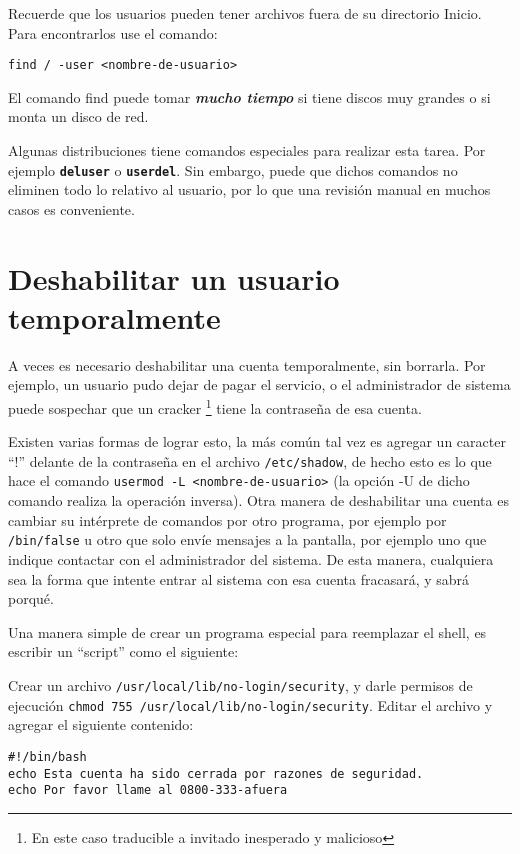\documentclass[12pt]{article}
\begin{document}
Recuerde que los usuarios pueden tener archivos fuera de su directorio
Inicio.  Para encontrarlos use el comando:

 \texttt{find / -user <nombre-de-usuario>} 

El comando find puede tomar \textit{\bf mucho tiempo} si
tiene discos muy grandes o si monta un disco de red.

Algunas distribuciones tiene comandos especiales para realizar esta tarea. Por 
ejemplo \texttt{\textbf{deluser}} o \texttt{\textbf{userdel}}. Sin embargo, puede 
que dichos comandos no eliminen todo lo relativo al usuario, por lo que una 
revisión manual en muchos casos es conveniente.  



\section*{ Deshabilitar un usuario temporalmente}

A veces es necesario deshabilitar una cuenta temporalmente, sin borrarla.
Por ejemplo, un usuario pudo dejar de pagar el servicio, o el administrador de
sistema puede sospechar que un cracker	\footnote{En este caso traducible a 
invitado inesperado y malicioso} tiene la contraseña de esa cuenta.

Existen varias formas de lograr esto, la más común tal vez es agregar un caracter 
``!'' delante de la contraseña en el archivo \texttt{/etc/shadow}, de hecho esto 
es lo que hace el comando \texttt{usermod -L <nombre-de-usuario>} (la opción -U
de dicho comando realiza la operación inversa). Otra manera de deshabilitar una 
cuenta es cambiar su intérprete de comandos por otro programa, por ejemplo por 
\texttt{/bin/false} u otro  que solo envíe mensajes a la pantalla, por 
ejemplo uno que indique contactar con el administrador del sistema. De esta manera, 
cualquiera sea la forma que intente entrar al sistema con esa cuenta fracasará, 
y sabrá porqué. 

Una manera simple de crear un programa especial para reemplazar el shell, 
es escribir un ``script'' como el siguiente: 

Crear un archivo \texttt{/usr/local/lib/no-login/security}, y darle permisos de 
ejecución \texttt{chmod 755 /usr/local/lib/no-login/security}. Editar
el archivo y agregar el siguiente contenido: 

\begin{verbatim} 
#!/bin/bash 
echo Esta cuenta ha sido cerrada por razones de seguridad.
echo Por favor llame al 0800-333-afuera
\end{verbatim}
\end{document}
